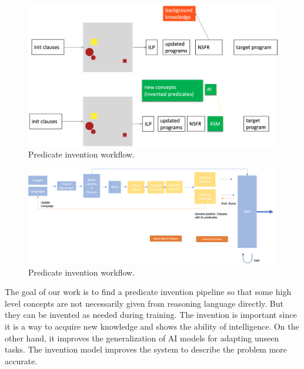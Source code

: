 \documentclass[
]{ceurart}
\begin{document}
\begin{figure}[h]
	\centering
	\begin{minipage}{\textwidth}
		\includegraphics[width=\linewidth]{img/intro_compare.png} 
		\caption{Predicate invention workflow.}
		\label{fig:Pipeline comparison between neural symbolic-ILP system without PI module and with PI module.}
	\end{minipage}
\end{figure}


\begin{figure}[h]
	\centering
	\begin{minipage}{\textwidth}
		\includegraphics[width=\linewidth]{img/pi_structure.png} 
		\caption{Predicate invention workflow.}
		\label{fig:pi-structure}
	\end{minipage}
\end{figure}

The goal of our work is to find a predicate invention pipeline so that some high level concepts are not necessarily given from reasoning language directly. But they can be invented as needed during training. The invention is important since it is a way to acquire new knowledge and shows the ability of intelligence. On the other hand, it improves the generalization of AI models for adapting unseen tasks. The invention model improves the system to describe the problem more accurate.
\end{document}
